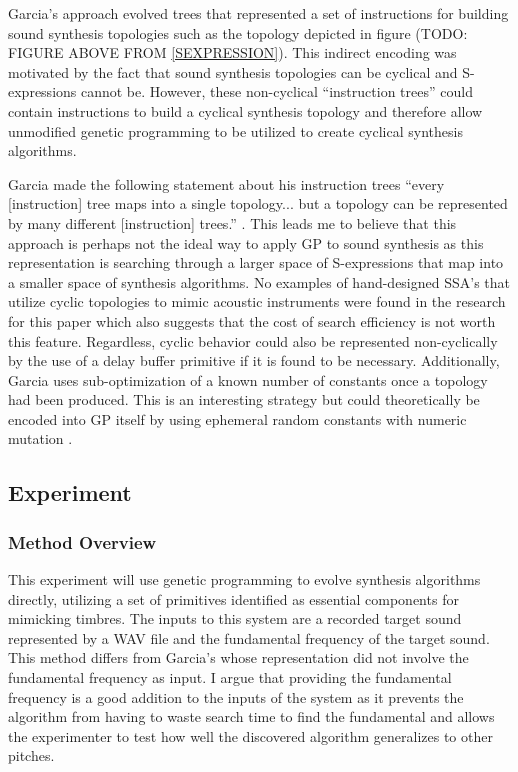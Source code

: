 \documentclass[12pt]{article}
\begin{document}
Garcia's approach evolved trees that represented a set of instructions for building sound synthesis topologies such as the topology depicted in figure (TODO: FIGURE ABOVE FROM \ref{SEXPRESSION}). This indirect encoding was motivated by the fact that sound synthesis topologies can be cyclical and S-expressions cannot be. However, these non-cyclical ``instruction trees'' could contain instructions to build a cyclical synthesis topology and therefore allow unmodified genetic programming to be utilized to create cyclical synthesis algorithms.

Garcia made the following statement about his instruction trees ``every [instruction] tree maps into a single topology... but a topology can be represented by many different [instruction] trees.'' \citep{garcia2012automatic}. This leads me to believe that this approach is perhaps not the ideal way to apply GP to sound synthesis as this representation is searching through a larger space of S-expressions that map into a smaller space of synthesis algorithms. No examples of hand-designed SSA's that utilize cyclic topologies to mimic acoustic instruments were found in the research for this paper which also suggests that the cost of search efficiency is not worth this feature. Regardless, cyclic behavior could also be represented non-cyclically by the use of a delay buffer primitive if it is found to be necessary. Additionally, Garcia uses sub-optimization of a known number of constants once a topology had been produced. This is an interesting strategy but could theoretically be encoded into GP itself by using ephemeral random constants with numeric mutation \citep{evett1998numeric}.

\subsection{Experiment}
\subsubsection{Method Overview}\label{TMMETHOD}
This experiment will use genetic programming to evolve synthesis algorithms directly, utilizing a set of primitives identified as essential components for mimicking timbres. The inputs to this system are a recorded target sound represented by a WAV file and the fundamental frequency of the target sound. This method differs from Garcia's whose representation did not involve the fundamental frequency as input. I argue that providing the fundamental frequency is a good addition to the inputs of the system as it prevents the algorithm from having to waste search time to find the fundamental and allows the experimenter to test how well the discovered algorithm generalizes to other pitches.
\end{document}

